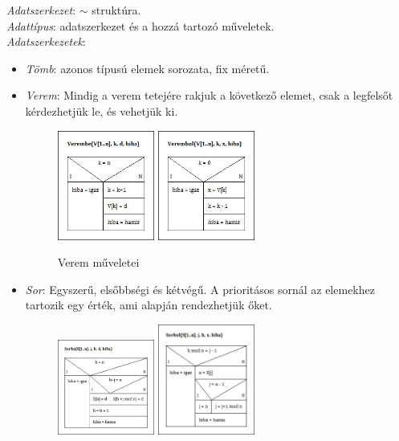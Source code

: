 \documentclass[margin=0px]{article}
\begin{document}
\textit{Adatszerkezet}: $\sim$ struktúra. \\
\textit{Adattípus}: adatszerkezet és a hozzá tartozó műveletek. \\
\textit{Adatszerkezetek}:
\begin{itemize}
    \item \textit{Tömb}: azonos típusú elemek sorozata, fix méretű.
    \item \textit{Verem}: Mindig a verem tetejére rakjuk a következő elemet, csak a legfelsőt kérdezhetjük le, és vehetjük ki.
          \begin{figure}[H]
              \centering
              \includegraphics[width=0.3\textwidth]{img/Verembe.jpg}
              \includegraphics[width=0.3\textwidth]{img/Verembol.jpg}
              \caption{Verem műveletei}
          \end{figure}
    \item \textit{Sor}: Egyszerű, elsőbbségi és kétvégű. A prioritásos sornál az elemekhez tartozik egy érték, ami alapján rendezhetjük  őket.
          \begin{figure}[H]
              \centering
              \includegraphics[width=0.3\textwidth]{img/Sorba.jpg}
              \includegraphics[width=0.3\textwidth]{img/Sorbol.jpg}

\end{figure}
\end{itemize}
\end{document}
